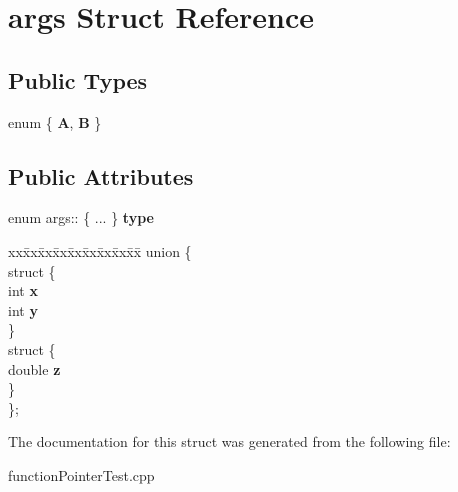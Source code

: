 \hypertarget{structargs}{}\section{args Struct Reference}
\label{structargs}
\subsection*{Public Types}
\begin{DoxyCompactItemize}
\item 
enum \{ {\bfseries A}, 
{\bfseries B}
 \}\hypertarget{structargs_a54c5a3a643a74c2e0dba4a3b8061d3e7}{}\label{structargs_a54c5a3a643a74c2e0dba4a3b8061d3e7}

\end{DoxyCompactItemize}
\subsection*{Public Attributes}
\begin{DoxyCompactItemize}
\item 
enum args\+:: \{ ... \}  {\bfseries type}\hypertarget{structargs_a02a35dd00d558011e5c80e4b5083c649}{}\label{structargs_a02a35dd00d558011e5c80e4b5083c649}

\item 
\begin{tabbing}
xx\=xx\=xx\=xx\=xx\=xx\=xx\=xx\=xx\=\kill
union \{\\
\>struct \{\\
\>\>int {\bfseries x}\\
\>\>int {\bfseries y}\\
\>\} \hypertarget{unionargs_1_1_0D1_afa6d8f0e9d79cc4603ad642ce19f883f}{}\label{unionargs_1_1_0D1_afa6d8f0e9d79cc4603ad642ce19f883f}
\\
\>struct \{\\
\>\>double {\bfseries z}\\
\>\} \hypertarget{unionargs_1_1_0D1_af071bca0f9407cbbf397f73a9e66ee60}{}\label{unionargs_1_1_0D1_af071bca0f9407cbbf397f73a9e66ee60}
\\
\}; \hypertarget{structargs_a28ad94ec1e5034e6ce9a4d6be87475a0}{}\label{structargs_a28ad94ec1e5034e6ce9a4d6be87475a0}
\\

\end{tabbing}\end{DoxyCompactItemize}


The documentation for this struct was generated from the following file\+:\begin{DoxyCompactItemize}
\item 
function\+Pointer\+Test.\+cpp\end{DoxyCompactItemize}
